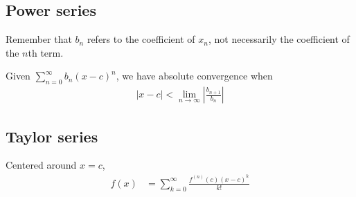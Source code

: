\documentclass[12pt]{article}
\newcommand{\abs}  [1]{\left|       #1 \right|      }
\begin{document}
\begin{multicols}{2}
\section*{Power series}
Remember that $b_n$ refers to the coefficient of $x_n$, not necessarily the coefficient of the $n$th term.

Given $\sum_{n=0}^\infty b_n (x-c)^n$, we have absolute convergence when
\begin{align*}
    \abs{x-c} < \lim_{n\to\infty} \abs{\frac{b_{n+1}}{b_n}}
\end{align*}

\subsection*{Taylor series}
Centered around $x=c$,
\begin{align*}
    f(x) &= \sum_{k=0}^\infty \frac{f^{(n)}(c) (x-c)^k}{k!}
\end{align*}

\end{multicols}
\end{document}
